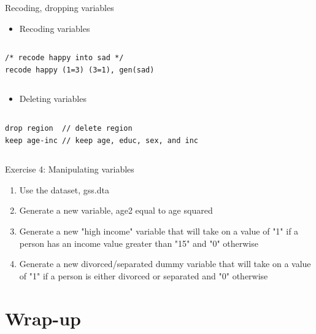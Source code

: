 \documentclass[table,smaller]{beamer}
\begin{document}
\begin{frame}[fragile,label=sec-4-6]{Recoding, dropping variables}
 \begin{itemize}
\item Recoding variables
\end{itemize}
\vspace{-.5em} \begin{columns}  \begin{block}{}
\begin{verbatim}
/* recode happy into sad */
recode happy (1=3) (3=1), gen(sad)
\end{verbatim}
\end{block} \end{columns}

\begin{itemize}
\item Deleting variables
\end{itemize}
\vspace{-.5em} \begin{columns}  \begin{block}{}
\begin{verbatim}
drop region  // delete region 
keep age-inc // keep age, educ, sex, and inc
\end{verbatim}
\end{block} \end{columns}
\end{frame}

\begin{frame}[label=sec-4-7]{Exercise 4: Manipulating variables}
\begin{enumerate}
\item Use the dataset, gss.dta
\item Generate a new variable, age2 equal to age squared
\item Generate a new "high income" variable that will take on a value of "1" if a person has an income value greater than "15" and "0" otherwise
\item Generate a new divorced/separated dummy variable that will take on a value of "1" if a person is either divorced or separated and "0" otherwise
\end{enumerate}
\end{frame}

\section{Wrap-up}
\label{sec-5}
\end{document}
